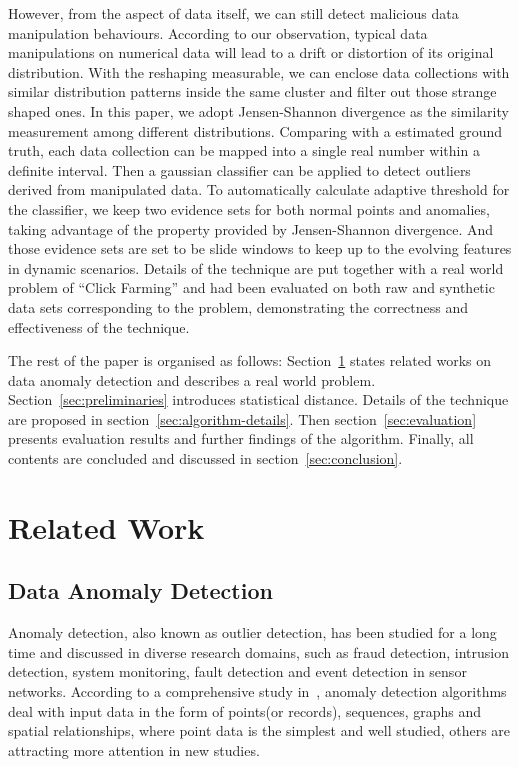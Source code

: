 \documentclass[10pt,conference,letterpaper]{IEEEtran}
\begin{document}
		However, from the aspect of data itself, we can still detect malicious data manipulation behaviours.
		According to our observation, typical data manipulations on numerical data will lead to a drift or distortion of its original distribution. With the reshaping measurable, we can enclose data collections with similar distribution patterns inside the same cluster and filter out those strange shaped ones. In this paper, we adopt Jensen-Shannon divergence as the similarity measurement among different distributions. Comparing with a estimated ground truth, each data collection can be mapped into a single real number within a definite interval. Then a gaussian classifier can be applied to detect outliers derived from manipulated data. To automatically calculate adaptive threshold for the classifier, we keep two evidence sets for both normal points and anomalies, taking advantage of the property provided by Jensen-Shannon divergence. And those evidence sets are set to be slide windows to keep up to the evolving features in dynamic scenarios.
		Details of the technique are put together with a real world problem of ``Click Farming'' and had been evaluated on both raw and synthetic data sets corresponding to the problem, demonstrating the correctness and effectiveness of the technique.
		
		The rest of the paper is organised as follows: Section~\ref{sec:related-work} states related works on data anomaly detection and describes a real world problem. Section~\ref{sec:preliminaries} introduces statistical distance. Details of the technique are proposed in section~\ref{sec:algorithm-details}. Then section~\ref{sec:evaluation} presents evaluation results and further findings of the algorithm. Finally, all contents are concluded and discussed in section~\ref{sec:conclusion}.
		
	\section{Related Work}\label{sec:related-work}
		\subsection{Data Anomaly Detection}
			Anomaly detection, also known as outlier detection, has been studied for a long time and discussed in diverse research domains, such as fraud detection, intrusion detection, system monitoring, fault detection and event detection in sensor networks. According to a comprehensive study in~\cite{chandola2009anomaly}, anomaly detection algorithms deal with input data in the form of points(or records), sequences, graphs and spatial relationships, where point data is the simplest and well studied, others are attracting more attention in new studies.
	
\end{document}
